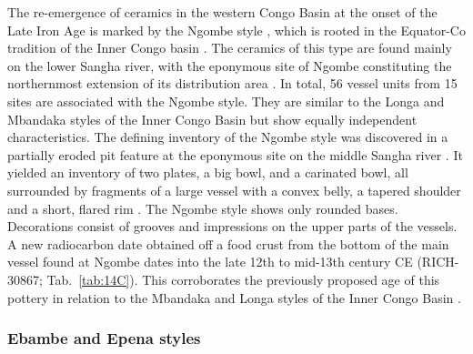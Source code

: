 \documentclass[smallextended,natbib]{svjour3}       %
\begin{document}
The re-emergence of ceramics in the western Congo Basin at the onset of the Late Iron Age is marked by the Ngombe style \citep[125--128]{Seidensticker.2021e}, which is rooted in the Equator-Co tradition of the Inner Congo basin \citep[222 Fig. 4]{Wotzka.1995}. The ceramics of this type are found mainly on the lower Sangha river, with the eponymous site of Ngombe constituting the northernmost extension of its distribution area \citep[127 Fig. 54]{Seidensticker.2021e}. In total, 56 vessel units from 15 sites are associated with the Ngombe style. They are similar to the Longa and Mbandaka styles \citep[121--128, 139--143]{Wotzka.1995} of the Inner Congo Basin but show equally independent characteristics. The defining inventory of the Ngombe style was discovered in a partially eroded pit feature at the eponymous site on the middle Sangha river \citep[305-–306, Pl.~42.15--44.2]{Seidensticker.2021e}. It yielded an inventory of two plates, a big bowl, and a carinated bowl, all surrounded by fragments of a large vessel with a convex belly, a tapered shoulder and a short, flared rim \citep[Fig.~\ref{fig:sangha}.8,10--11;][Pl. 42.15--44.2]{Seidensticker.2021e}. The Ngombe style shows only rounded bases. Decorations consist of grooves and impressions on the upper parts of the vessels. A new radiocarbon date obtained off a food crust from the bottom of the main vessel found at Ngombe dates into the late 12th to mid-13th century CE (RICH-30867; Tab.~\ref{tab:14C}). This corroborates the previously proposed age of this pottery in relation to the Mbandaka and Longa styles of the Inner Congo Basin \citep[Fig.~\ref{fig:bayes}, \ref{fig:chrono}, \ref{fig:timeslices}; Tab.~\ref{tab:bayes};][126--128]{Seidensticker.2021e}. 

\subsubsection*{Ebambe and Epena styles}
\end{document}
